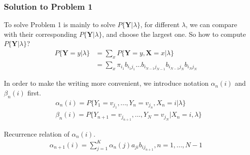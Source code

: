\documentclass[runningheads]{llncs}
\begin{document}
\subsubsection{Solution to Problem 1}
To solve Problem 1 is mainly to solve $P \{ \mathbf{Y} | \lambda \} $,
for different $\lambda$, we can compare with their corresponding
$P \{ \mathbf{Y} | \lambda \} $, and choose the largest one.
So how to compute $P \{ \mathbf{Y} | \lambda \} $?
\begin{align}
    P \{ \mathbf{Y} = y | \lambda \}
    &= \sum_x P \{ \mathbf{Y} = y, \mathbf{X} = x | \lambda \} \\
    &= \sum_x \pi_{i_1} b_{i_1 j_1}... b_{i_{N-1} j_{N-1}} b_{i_{N-1} j_{N}} b_{i_{N} j_{N}}
\end{align}
\par
In order to make the writing more convenient, we introduce notation
$\alpha_n(i)$ and $\beta_n(i)$ first.
\begin{align}
    &\alpha_n(i) = P \{ Y_1 = v_{j_1},..., Y_n = v_{j_n}, X_n = i | \lambda \} \\
    &\beta_n(i) = P \{ Y_{n+1} = v_{j_{n+1}},...,Y_N = v_{j_N} | X_n = i, \lambda \}
\end{align}
\par
Recurrence relation of $\alpha_n(i)$.
\begin{align}
    \alpha_{n+1}(i) = \sum_{j=1}^K \alpha_n(j) a_{ji} b_{ij_{n+1}}, n = 1,..., N - 1
\end{align}
\end{document}
